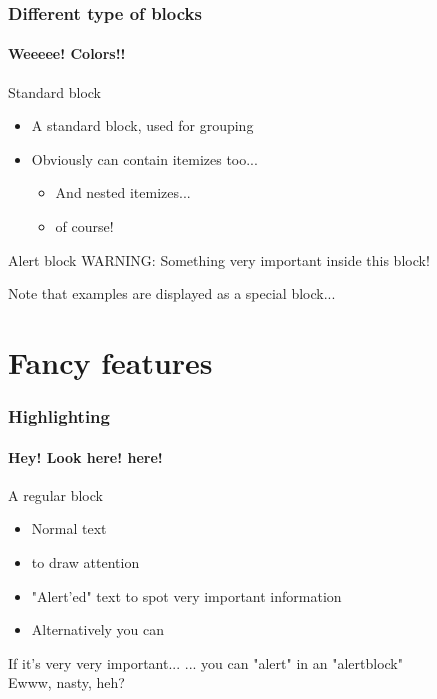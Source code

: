 \documentclass[12pt]{beamer}
\begin{document}
\begin{frame}
  \frametitle{Different type of blocks}
  \framesubtitle{Weeeee! Colors!!}
  \begin{block}{Standard block}
  \begin{itemize}
    \item A standard block, used for grouping
    \item Obviously can contain itemizes too...
    \begin{itemize}
      \item And nested itemizes...
      \item of course!
    \end{itemize}
  \end{itemize}
  \end{block}
  \begin{alertblock}{Alert block}
  WARNING: Something very important inside this block!
  \end{alertblock}
  \begin{example}
  Note that examples are displayed as a special block...
  \end{example}
\end{frame}

\section{Fancy features}
\begin{frame}
  \frametitle{Highlighting}
  \framesubtitle{Hey! Look here! here!}

  \begin{block}{A regular block}
  \begin{itemize}
    \item Normal text
    \item {} to draw attention
    \item \alert{"Alert'ed" text} to spot very important information
    \item Alternatively you can
  \end{itemize}
  \end{block}
  \begin{alertblock}{If it's very very important...}
  \alert{... you can "alert" in an "alertblock"}\\
  Ewww, nasty, heh?
  \end{alertblock}
\end{frame}
\end{document}
